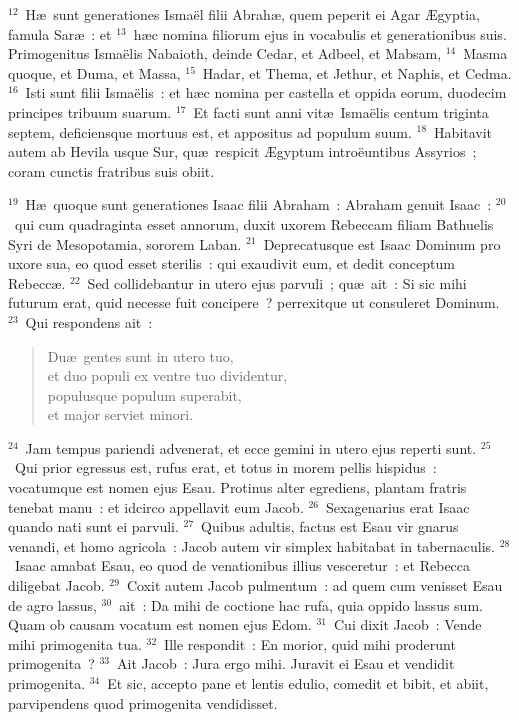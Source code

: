 ${}^{12}$~H\ae\ sunt generationes Isma\"el filii Abrah\ae , quem peperit ei Agar \AE gyptia, famula Sar\ae~: et
${}^{13}$~h\ae c nomina filiorum ejus in vocabulis et generationibus suis. Primogenitus Isma\"elis Nabaioth, deinde Cedar, et Adbeel, et Mabsam,
${}^{14}$~Masma quoque, et Duma, et Massa,
${}^{15}$~Hadar, et Thema, et Jethur, et Naphis, et Cedma.
${}^{16}$~Isti sunt filii Isma\"elis~: et h\ae c nomina per castella et oppida eorum, duodecim principes tribuum suarum.
${}^{17}$~Et facti sunt anni vit\ae\ Isma\"elis centum triginta septem, deficiensque mortuus est, et appositus ad populum suum.
${}^{18}$~Habitavit autem ab Hevila usque Sur, qu\ae\ respicit \AE gyptum intro\"euntibus Assyrios~; coram cunctis fratribus suis obiit.


${}^{19}$~H\ae\ quoque sunt generationes Isaac filii Abraham~: Abraham genuit Isaac~:
${}^{20}$~qui cum quadraginta esset annorum, duxit uxorem Rebeccam filiam Bathuelis Syri de Mesopotamia, sororem Laban.
${}^{21}$~Deprecatusque est Isaac Dominum pro uxore sua, eo quod esset sterilis~: qui exaudivit eum, et dedit conceptum Rebecc\ae .
${}^{22}$~Sed collidebantur in utero ejus parvuli~; qu\ae\ ait~: Si sic mihi futurum erat, quid necesse fuit concipere~? perrexitque ut consuleret Dominum.
${}^{23}$~Qui respondens ait~: \begin{flushleft}\begin{verse}Du\ae\ gentes sunt in utero tuo,\\ et duo populi ex ventre tuo dividentur,\\ populusque populum superabit,\\ et major serviet minori.\end{verse}\end{flushleft}


${}^{24}$~Jam tempus pariendi advenerat, et ecce gemini in utero ejus reperti sunt.
${}^{25}$~Qui prior egressus est, rufus erat, et totus in morem pellis hispidus~: vocatumque est nomen ejus Esau. Protinus alter egrediens, plantam fratris tenebat manu~: et idcirco appellavit eum Jacob.
${}^{26}$~Sexagenarius erat Isaac quando nati sunt ei parvuli.
${}^{27}$~Quibus adultis, factus est Esau vir gnarus venandi, et homo agricola~: Jacob autem vir simplex habitabat in tabernaculis.
${}^{28}$~Isaac amabat Esau, eo quod de venationibus illius vesceretur~: et Rebecca diligebat Jacob.
${}^{29}$~Coxit autem Jacob pulmentum~: ad quem cum venisset Esau de agro lassus,
${}^{30}$~ait~: Da mihi de coctione hac rufa, quia oppido lassus sum. Quam ob causam vocatum est nomen ejus Edom.
${}^{31}$~Cui dixit Jacob~: Vende mihi primogenita tua.
${}^{32}$~Ille respondit~: En morior, quid mihi proderunt primogenita~?
${}^{33}$~Ait Jacob~: Jura ergo mihi. Juravit ei Esau et vendidit primogenita.
${}^{34}$~Et sic, accepto pane et lentis edulio, comedit et bibit, et abiit, parvipendens quod primogenita vendidisset.

